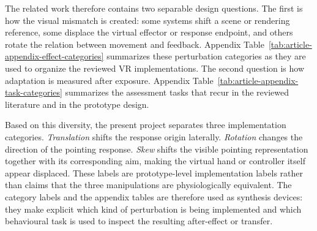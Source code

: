 The related work therefore contains two separable design questions. The first is how the visual mismatch is created: some systems shift a scene or rendering reference, some displace the virtual effector or response endpoint, and others rotate the relation between movement and feedback. Appendix Table~\ref{tab:article-appendix-effect-categories} summarizes these perturbation categories as they are used to organize the reviewed VR implementations. The second question is how adaptation is measured after exposure. Appendix Table~\ref{tab:article-appendix-task-categories} summarizes the assessment tasks that recur in the reviewed literature and in the prototype design.

Based on this diversity, the present project separates three implementation categories. \emph{Translation} shifts the response origin laterally. \emph{Rotation} changes the direction of the pointing response. \emph{Skew} shifts the visible pointing representation together with its corresponding aim, making the virtual hand or controller itself appear displaced. These labels are prototype-level implementation labels rather than claims that the three manipulations are physiologically equivalent. The category labels and the appendix tables are therefore used as synthesis devices: they make explicit which kind of perturbation is being implemented and which behavioural task is used to inspect the resulting after-effect or transfer.
